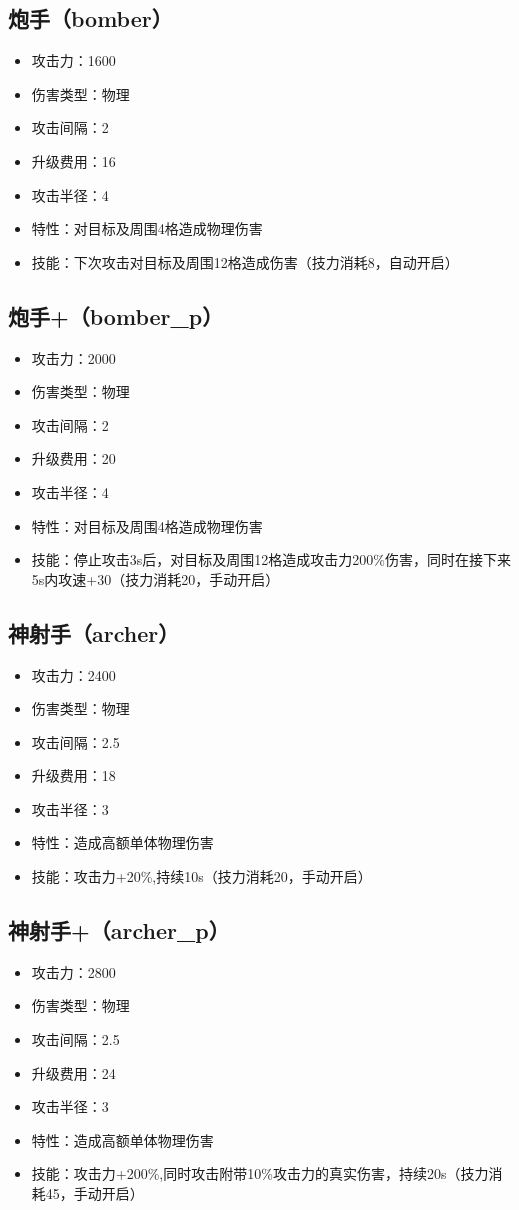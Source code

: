 \documentclass[a4paper,12pt]{article}
\begin{document}
		\subsection{炮手（bomber）}
			\begin{itemize}
				\item 攻击力：1600
				\item 伤害类型：物理
				\item 攻击间隔：2
				\item 升级费用：16
				\item 攻击半径：4
				\item 特性：对目标及周围4格造成物理伤害
				\item 技能：下次攻击对目标及周围12格造成伤害（技力消耗8，自动开启）
			\end{itemize}
		\subsection{炮手+（bomber\_p）}
			\begin{itemize}
				\item 攻击力：2000
				\item 伤害类型：物理
				\item 攻击间隔：2
				\item 升级费用：20
				\item 攻击半径：4
				\item 特性：对目标及周围4格造成物理伤害
				\item 技能：停止攻击3s后，对目标及周围12格造成攻击力200\%伤害，同时在接下来5s内攻速+30（技力消耗20，手动开启）
			\end{itemize}
		\subsection{神射手（archer）}
			\begin{itemize}
				\item 攻击力：2400
				\item 伤害类型：物理
				\item 攻击间隔：2.5
				\item 升级费用：18
				\item 攻击半径：3
				\item 特性：造成高额单体物理伤害
				\item 技能：攻击力+20\%,持续10s（技力消耗20，手动开启）
			\end{itemize}
		\subsection{神射手+（archer\_p）}
			\begin{itemize}
				\item 攻击力：2800
				\item 伤害类型：物理
				\item 攻击间隔：2.5
				\item 升级费用：24
				\item 攻击半径：3
				\item 特性：造成高额单体物理伤害
				\item 技能：攻击力+200\%,同时攻击附带10\%攻击力的真实伤害，持续20s（技力消耗45，手动开启）
			\end{itemize}
\end{document}
